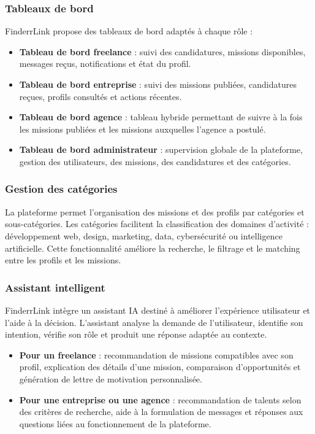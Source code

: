\subsubsection{Tableaux de bord}

FinderrLink propose des tableaux de bord adaptés à chaque rôle :

\begin{itemize}
    \item \textbf{Tableau de bord freelance} : suivi des candidatures, missions disponibles, messages reçus, notifications et état du profil.
    \item \textbf{Tableau de bord entreprise} : suivi des missions publiées, candidatures reçues, profils consultés et actions récentes.
    \item \textbf{Tableau de bord agence} : tableau hybride permettant de suivre à la fois les missions publiées et les missions auxquelles l'agence a postulé.
    \item \textbf{Tableau de bord administrateur} : supervision globale de la plateforme, gestion des utilisateurs, des missions, des candidatures et des catégories.
\end{itemize}

\subsubsection{Gestion des catégories}

La plateforme permet l'organisation des missions et des profils par catégories et sous-catégories. Les catégories facilitent la classification des domaines d'activité : développement web, design, marketing, data, cybersécurité ou intelligence artificielle. Cette fonctionnalité améliore la recherche, le filtrage et le matching entre les profils et les missions.

\subsubsection{Assistant intelligent}

FinderrLink intègre un assistant IA destiné à améliorer l'expérience utilisateur et l'aide à la décision. L'assistant analyse la demande de l'utilisateur, identifie son intention, vérifie son rôle et produit une réponse adaptée au contexte.

\begin{itemize}
    \item \textbf{Pour un freelance} : recommandation de missions compatibles avec son profil, explication des détails d'une mission, comparaison d'opportunités et génération de lettre de motivation personnalisée.
    \item \textbf{Pour une entreprise ou une agence} : recommandation de talents selon des critères de recherche, aide à la formulation de messages et réponses aux questions liées au fonctionnement de la plateforme.
\end{itemize}

